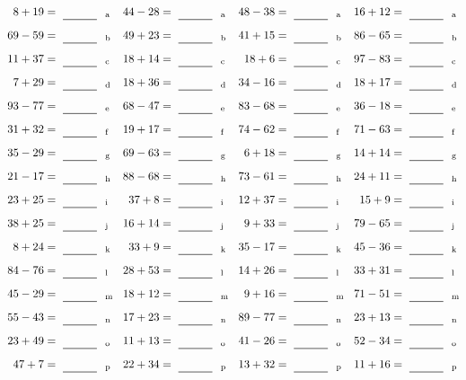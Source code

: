 \documentclass
[
  draft    = true,
  fontsize = 11pt,
  parskip  = half-
]
{scrartcl}
\begin{document}
\clearpage
\begin{align*}
    \pline{8+19}&=\rline{a}
  & \pline{44-28}&=\rline{a}
  & \pline{48-38}&=\rline{a}
  & \pline{16+12}&=\rline{a} \\[1ex]
    \pline{69-59}&=\rline{b}
  & \pline{49+23}&=\rline{b}
  & \pline{41+15}&=\rline{b}
  & \pline{86-65}&=\rline{b} \\[1ex]
    \pline{11+37}&=\rline{c}
  & \pline{18+14}&=\rline{c}
  & \pline{18+6}&=\rline{c}
  & \pline{97-83}&=\rline{c} \\[1ex]
    \pline{7+29}&=\rline{d}
  & \pline{18+36}&=\rline{d}
  & \pline{34-16}&=\rline{d}
  & \pline{18+17}&=\rline{d} \\[1ex]
    \pline{93-77}&=\rline{e}
  & \pline{68-47}&=\rline{e}
  & \pline{83-68}&=\rline{e}
  & \pline{36-18}&=\rline{e} \\[1ex]
    \pline{31+32}&=\rline{f}
  & \pline{19+17}&=\rline{f}
  & \pline{74-62}&=\rline{f}
  & \pline{71-63}&=\rline{f} \\[1ex]
    \pline{35-29}&=\rline{g}
  & \pline{69-63}&=\rline{g}
  & \pline{6+18}&=\rline{g}
  & \pline{14+14}&=\rline{g} \\[1ex]
    \pline{21-17}&=\rline{h}
  & \pline{88-68}&=\rline{h}
  & \pline{73-61}&=\rline{h}
  & \pline{24+11}&=\rline{h} \\[1ex]
    \pline{23+25}&=\rline{i}
  & \pline{37+8}&=\rline{i}
  & \pline{12+37}&=\rline{i}
  & \pline{15+9}&=\rline{i} \\[1ex]
    \pline{38+25}&=\rline{j}
  & \pline{16+14}&=\rline{j}
  & \pline{9+33}&=\rline{j}
  & \pline{79-65}&=\rline{j} \\[1ex]
    \pline{8+24}&=\rline{k}
  & \pline{33+9}&=\rline{k}
  & \pline{35-17}&=\rline{k}
  & \pline{45-36}&=\rline{k} \\[1ex]
    \pline{84-76}&=\rline{l}
  & \pline{28+53}&=\rline{l}
  & \pline{14+26}&=\rline{l}
  & \pline{33+31}&=\rline{l} \\[1ex]
    \pline{45-29}&=\rline{m}
  & \pline{18+12}&=\rline{m}
  & \pline{9+16}&=\rline{m}
  & \pline{71-51}&=\rline{m} \\[1ex]
    \pline{55-43}&=\rline{n}
  & \pline{17+23}&=\rline{n}
  & \pline{89-77}&=\rline{n}
  & \pline{23+13}&=\rline{n} \\[1ex]
    \pline{23+49}&=\rline{o}
  & \pline{11+13}&=\rline{o}
  & \pline{41-26}&=\rline{o}
  & \pline{52-34}&=\rline{o} \\[1ex]
    \pline{47+7}&=\rline{p}
  & \pline{22+34}&=\rline{p}
  & \pline{13+32}&=\rline{p}
  & \pline{11+16}&=\rline{p}
\end{align*}
\end{document}
